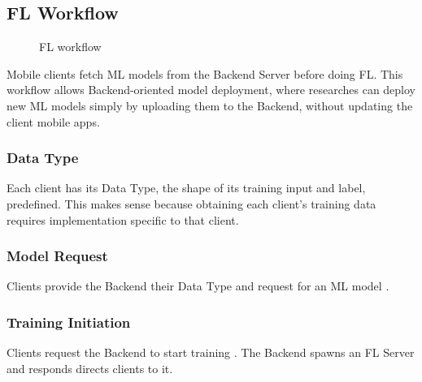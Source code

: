 \documentclass[letterpaper]{article} %
\begin{document}
\subsection{FL Workflow}

\begin{figure}
\centering
{}
\caption{FL workflow}
\label{fig:fl-workflow}
\end{figure}

Mobile clients fetch ML models from the Backend Server before doing FL.
This workflow allows Backend-oriented model deployment, where researches can
deploy new ML models simply by uploading them to the Backend,
without updating the client mobile apps.

\subsubsection{Data Type}
Each client has its Data Type, the shape of its training input and label,
predefined.
This makes sense because obtaining each client's training data requires
implementation specific to that client.

\subsubsection{Model Request}
Clients provide the Backend their Data Type and request for an ML model \model.

\subsubsection{Training Initiation}
Clients request the Backend to start training \model.
The Backend spawns an FL Server \fs{} and responds directs clients to it.
\end{document}
